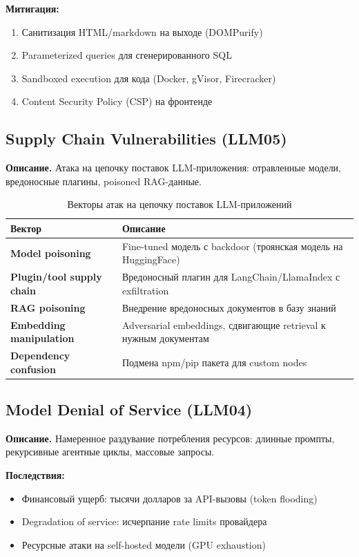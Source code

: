 \documentclass[12pt,a4paper]{article}
\begin{document}
\textbf{Митигация:}
\begin{enumerate}
  \item Санитизация HTML/markdown на выходе (DOMPurify)
  \item Parameterized queries для сгенерированного SQL
  \item Sandboxed execution для кода (Docker, gVisor, Firecracker)
  \item Content Security Policy (CSP) на фронтенде
\end{enumerate}

\subsection{Supply Chain Vulnerabilities (LLM05)}

\textbf{Описание.} Атака на цепочку поставок LLM-приложения: отравленные модели, вредоносные плагины, poisoned RAG-данные.

\begin{table}[H]
\centering
\small
\begin{tabularx}{\textwidth}{>{\bfseries}l X}
\toprule
Вектор & Описание \\
\midrule
Model poisoning & Fine-tuned модель с backdoor (троянская модель на HuggingFace) \\
Plugin/tool supply chain & Вредоносный плагин для LangChain/LlamaIndex с exfiltration \\
RAG poisoning & Внедрение вредоносных документов в базу знаний \\
Embedding manipulation & Adversarial embeddings, сдвигающие retrieval к нужным документам \\
Dependency confusion & Подмена npm/pip пакета для custom nodes \\
\bottomrule
\end{tabularx}
\caption{Векторы атак на цепочку поставок LLM-приложений}
\end{table}

\subsection{Model Denial of Service (LLM04)}

\textbf{Описание.} Намеренное раздувание потребления ресурсов: длинные промпты, рекурсивные агентные циклы, массовые запросы.

\textbf{Последствия:}
\begin{itemize}
  \item Финансовый ущерб: тысячи долларов за API-вызовы (token flooding)
  \item Degradation of service: исчерпание rate limits провайдера
  \item Ресурсные атаки на self-hosted модели (GPU exhaustion)
\end{itemize}
\end{document}
